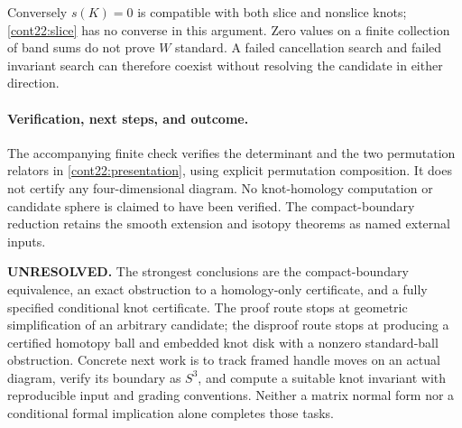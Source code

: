 \documentclass[11pt]{article}
\begin{document}
Conversely $s(K)=0$ is compatible with both slice and nonslice knots;
\eqref{cont22:slice} has no converse in this argument. Zero values on
a finite collection of band sums do not prove $W$ standard. A failed
cancellation search and failed invariant search can therefore coexist
without resolving the candidate in either direction.

\paragraph{Verification, next steps, and outcome.}
The accompanying finite check verifies the determinant and the two
permutation relators in \eqref{cont22:presentation}, using explicit
permutation composition. It does not certify any four-dimensional
diagram. No knot-homology computation or candidate sphere is claimed
to have been verified. The compact-boundary reduction retains the
smooth extension and isotopy theorems as named external inputs.

\textbf{UNRESOLVED.} The strongest conclusions are the compact-boundary
equivalence, an exact obstruction to a homology-only certificate, and
a fully specified conditional knot certificate. The proof route stops
at geometric simplification of an arbitrary candidate; the disproof
route stops at producing a certified homotopy ball and embedded knot
disk with a nonzero standard-ball obstruction. Concrete next work is
to track framed handle moves on an actual diagram, verify its boundary
as $S^3$, and compute a suitable knot invariant with reproducible input
and grading conventions. Neither a matrix normal form nor a conditional
formal implication alone completes those tasks.
\end{document}
